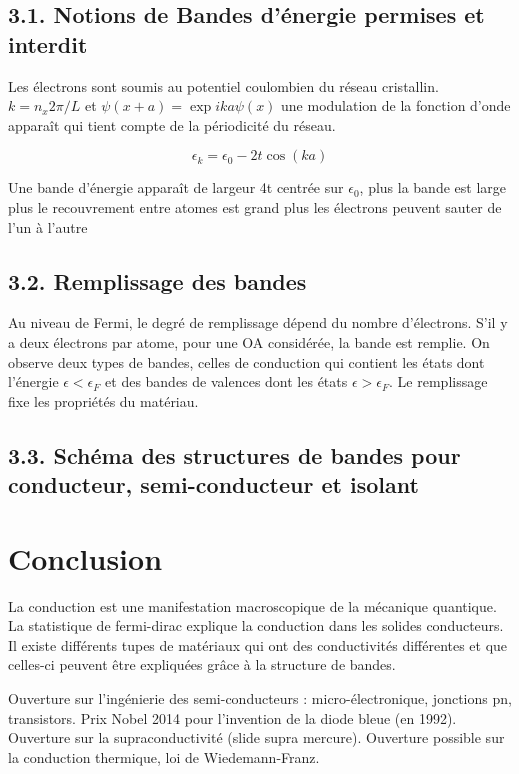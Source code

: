 \documentclass[french, a4paper, 10pt, twocolumn, landscape]{article}
\begin{document}
\subsection*{3.1. Notions de Bandes d'énergie permises et interdit}
Les électrons sont soumis au potentiel coulombien du réseau cristallin. $k = n_x2\pi/L$ et $\psi(x+a)=\exp{ika}\psi(x)$ une modulation de la fonction d'onde apparaît qui tient compte de la périodicité du réseau.

\begin{equation}
    \epsilon_k =\epsilon_0-2t\cos(ka)
\end{equation}

Une bande d'énergie apparaît de largeur 4t centrée sur $\epsilon_0$, plus la bande est large plus le recouvrement entre atomes est grand plus les électrons peuvent sauter de l'un à l'autre

\subsection*{3.2. Remplissage des bandes}

Au niveau de Fermi, le degré de remplissage dépend du nombre d'électrons. S'il y a deux électrons par atome, pour une OA considérée, la bande est remplie. On observe deux types de bandes, celles de conduction qui contient les états dont l'énergie $\epsilon < \epsilon_F$ et des bandes de valences dont les états $\epsilon > \epsilon_F$. Le remplissage fixe les propriétés du matériau.

\subsection*{3.3. Schéma des structures de bandes pour conducteur, semi-conducteur et isolant}


\section*{Conclusion}

La conduction est une manifestation macroscopique de la mécanique quantique. La statistique de fermi-dirac explique la conduction dans les solides conducteurs. Il existe différents tupes de matériaux qui ont des conductivités différentes et que celles-ci peuvent être expliquées grâce à la structure de bandes.\medskip

Ouverture sur l’ingénierie des semi-conducteurs : micro-électronique, jonctions
pn, transistors. Prix Nobel 2014 pour l’invention de la diode bleue (en 1992).
Ouverture sur la supraconductivité (slide supra mercure).
Ouverture possible sur la conduction thermique, loi de Wiedemann-Franz.
\end{document}
